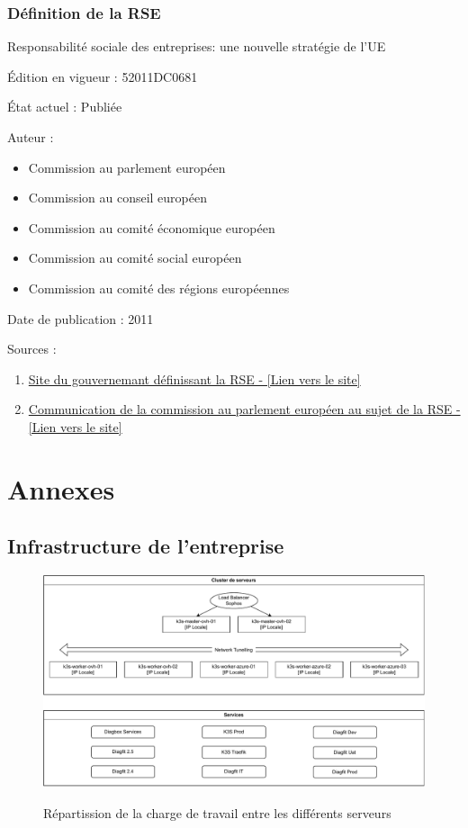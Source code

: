 \subsubsection{Définition de la RSE}\label{rse}
Responsabilité sociale des entreprises: une nouvelle stratégie de l'UE\par
Édition en vigueur : 52011DC0681\par
État actuel : Publiée\par
Auteur : 
\begin{itemize}
    \item Commission au parlement européen
    \item Commission au conseil européen
    \item Commission au comité économique européen
    \item Commission au comité social européen
    \item Commission au comité des régions européennes
\end{itemize}\par
Date de publication : 2011\par
Sources : 
\begin{enumerate}
    \item \href{https://www.economie.gouv.fr/entreprises/responsabilite-societale-entreprises-rse}{\textcolor{imtneCeleste}{Site du gouvernemant définissant la RSE - [Lien vers le site]}}
    \item \href{https://eur-lex.europa.eu/legal-content/FR/TXT/?uri=celex:52011DC0681}{\textcolor{imtneCeleste}{Communication de la commission au parlement européen au sujet de la RSE - [Lien vers le site]}}
\end{enumerate}




\newpage
\section*{Annexes}
\subsection*{Infrastructure de l'entreprise}
\begin{figure}[ht!]
    \centering
    \includegraphics[width=\textwidth]{paper/figures/balancer.pdf}
    \label{balancer}
    \caption{Répartission de la charge de travail entre les différents serveurs}
\end{figure}

